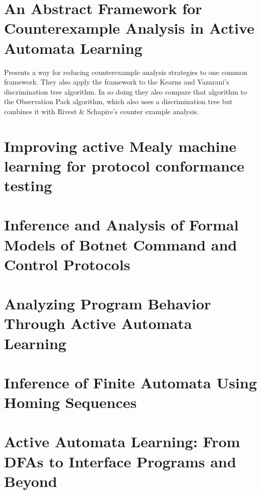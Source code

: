 \documentclass[11pt]{article}
\begin{document}
\section{An Abstract Framework for Counterexample Analysis in Active Automata Learning\cite{Isberner14a}}
Presents a way for reducing counterexample analysis strategies to one common
framework. They also apply the framework to the Kearns and Vazarani's
discrimination tree algorithm\cite{Kearns94}. In so doing they also compare that
algorithm to the Observation Pack algorithm, which also uses a discrimination
tree but combines it with Rivest \& Schapire's counter example
analysis\cite{Rivest93}.

\section{\cite{Aarts13} Improving active Mealy machine learning for protocol conformance testing}
\section{\cite{Cho10} Inference and Analysis of Formal Models of Botnet Command and Control Protocols}
\section{\cite{Bauer14} Analyzing Program Behavior Through Active Automata Learning}
\section{\cite{Rivest93} Inference of Finite Automata Using Homing Sequences}
\section{\cite{Steffen12} Active Automata Learning: From DFAs to Interface Programs and Beyond}

{}

\end{document}
